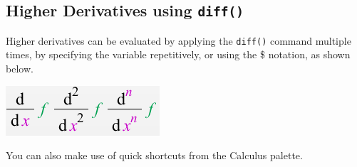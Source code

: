 \begin{maplegroup}
\begin{mapleinput}
\end{mapleinput}
\mapleresult
\begin{maplelatex}
\end{maplelatex}
\mapleresult
\begin{maplelatex}
\end{maplelatex}
\end{maplegroup}

\subsection{Higher Derivatives using \texttt{diff()}}

Higher derivatives can be evaluated by applying the \texttt{diff()} command multiple times, by specifying the variable repetitively, or using the \$ notation, as shown below.
\begin{maplegroup}
\begin{mapleinput}
\end{mapleinput}
\mapleresult
\begin{maplelatex}
\end{maplelatex}
\mapleresult
\begin{maplelatex}
\end{maplelatex}
\end{maplegroup}

\begin{maplegroup}
\begin{mapleinput}
\end{mapleinput}
\mapleresult
\begin{maplelatex}
\end{maplelatex}
\end{maplegroup}

\begin{marginfigure}
\centering
\includegraphics[scale=0.8]{tutorials/figures/palettediff.png}
\caption{You can also make use of quick shortcuts from the Calculus palette.}
\end{marginfigure}

